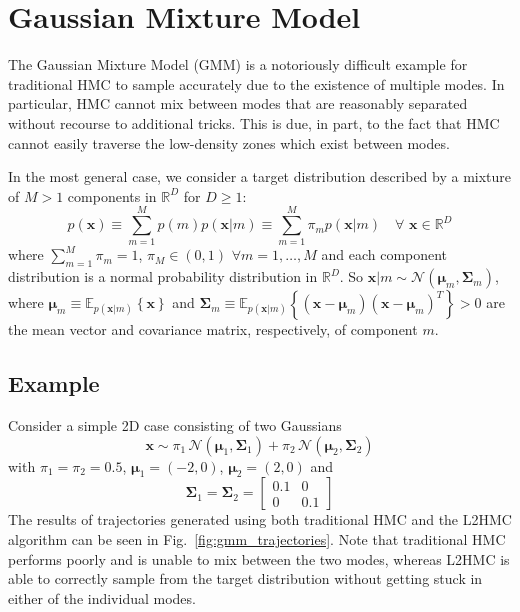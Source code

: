 \documentclass[main.tex]{subfiles}
\begin{document}
\section{Gaussian Mixture Model}%
\label{sec:l2hmc_gmm}
%
The Gaussian Mixture Model (GMM) is a notoriously difficult example for traditional HMC to sample accurately due to the
existence of multiple modes.
%
In particular, HMC cannot mix between modes that are reasonably separated without recourse to additional tricks.
%
This is due, in part, to the fact that HMC cannot easily traverse the low-density zones which exist between modes.

In the most general case, we consider a target distribution described by a mixture of $M > 1$ components in
$\mathbb{R}^{D}$ for $D \geq 1$:
%
\begin{equation}
    p(\mathbf{x}) \equiv \sum_{m=1}^{M} p(m) p(\mathbf{x}|m) \equiv
        \sum_{m=1}^{M} \pi_m p(\mathbf{x}|m) \quad \forall \,\,\mathbf{x} \in
        \mathbb{R}^{D}
    \label{eq:gmm_model}
\end{equation}
%
where $\sum_{m=1}^{M} \pi_m = 1$, $\pi_M \in (0, 1)$ $\forall m = 1, \ldots, M$ and each component distribution is a
normal probability distribution in $\mathbb{R}^{D}$.
%
So $\mathbf{x}|m \sim \mathcal{N}(\bm{\mu}_m, \bm{\Sigma}_m)$, where $\bm{\mu}_m \equiv
\mathbb{E}_{p{(\mathbf{x}|m)}}\left\{\mathbf{x}\right\}$ and $\mathbf{\Sigma}_m \equiv
\mathbb{E}_{p{(\mathbf{x}|m)}}{\left\{{(\mathbf{x} - \bm{\mu}_m)}{(\mathbf{x} - \bm{\mu}_m)}^{T}\right\}} > 0$ are the
mean vector and covariance matrix, respectively, of component $m$.
%
\subsection{Example}
%
Consider a simple 2D case consisting of two Gaussians 
%
\begin{equation}
    \mathbf{x} \sim \pi_1 \,\mathcal{N}(\bm{\mu}_1, \bm{\Sigma}_1) +
        \pi_2\, \mathcal{N}(\bm{\mu}_2, \bm{\Sigma}_2)
    \label{eq:log_likelihood_example}
\end{equation}
%
with $\pi_1 = \pi_2 = 0.5$, $\bm{\mu}_1 = (-2, 0)$, $\bm{\mu}_2 = (2, 0)$ and
%
\begin{equation}
    \bm{\Sigma}_1 = \bm{\Sigma}_2 = 
        \begin{bmatrix}
            0.1    & 0 \\
            0       & 0.1 
        \end{bmatrix}
    \label{eq:covariance_matrix}
\end{equation}
%
The results of trajectories generated using both traditional HMC and the L2HMC algorithm can be seen in
Fig.~\ref{fig:gmm_trajectories}.
%
Note that traditional HMC performs poorly and is unable to mix between the two modes, whereas L2HMC is able to
correctly sample from the target distribution without getting stuck in either of the individual modes.
\end{document}
